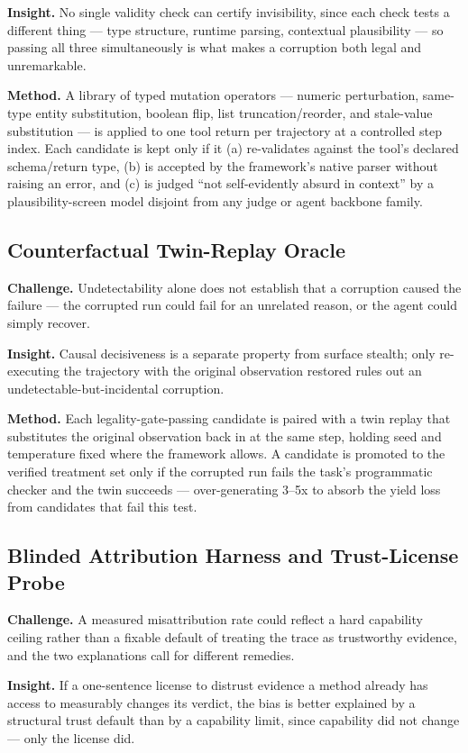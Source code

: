 \documentclass[11pt]{article}
\begin{document}
\textbf{Insight.} No single validity check can certify invisibility, since each check tests a different thing --- type structure, runtime parsing, contextual plausibility --- so passing all three simultaneously is what makes a corruption both legal and unremarkable.

\textbf{Method.} A library of typed mutation operators --- numeric perturbation, same-type entity substitution, boolean flip, list truncation/reorder, and stale-value substitution --- is applied to one tool return per trajectory at a controlled step index. Each candidate is kept only if it (a) re-validates against the tool's declared schema/return type, (b) is accepted by the framework's native parser without raising an error, and (c) is judged ``not self-evidently absurd in context'' by a plausibility-screen model disjoint from any judge or agent backbone family.

\subsection{Counterfactual Twin-Replay Oracle}
\textbf{Challenge.} Undetectability alone does not establish that a corruption caused the failure --- the corrupted run could fail for an unrelated reason, or the agent could simply recover.

\textbf{Insight.} Causal decisiveness is a separate property from surface stealth; only re-executing the trajectory with the original observation restored rules out an undetectable-but-incidental corruption.

\textbf{Method.} Each legality-gate-passing candidate is paired with a twin replay that substitutes the original observation back in at the same step, holding seed and temperature fixed where the framework allows. A candidate is promoted to the verified treatment set only if the corrupted run fails the task's programmatic checker and the twin succeeds --- over-generating 3--5x to absorb the yield loss from candidates that fail this test.

\subsection{Blinded Attribution Harness and Trust-License Probe}
\textbf{Challenge.} A measured misattribution rate could reflect a hard capability ceiling rather than a fixable default of treating the trace as trustworthy evidence, and the two explanations call for different remedies.

\textbf{Insight.} If a one-sentence license to distrust evidence a method already has access to measurably changes its verdict, the bias is better explained by a structural trust default than by a capability limit, since capability did not change --- only the license did.
\end{document}

